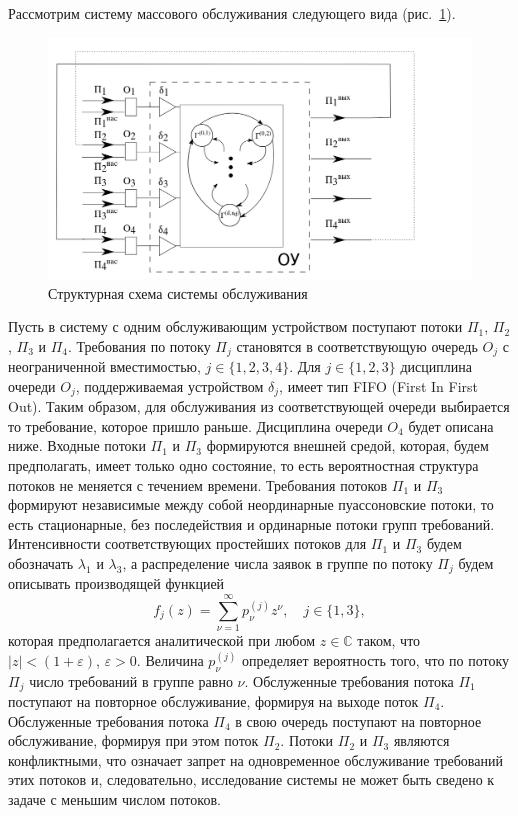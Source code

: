 \documentclass[12pt]{extarticle}
\theoremstyle{theorem}
\theoremstyle{remark}
\begin{document}
Рассмотрим систему массового обслуживания следующего вида (рис.~\ref{SystemScheme}).
\begin{figure}[h]
\includegraphics[scale=0.4]{SystemScheme.png} 
\caption{Структурная схема системы обслуживания}
\label{SystemScheme}
\end{figure}
Пусть в систему с одним обслуживающим устройством поступают потоки $\Pi_1$, $\Pi_2$, $\Pi_3$  и $\Pi_4$. Требования по потоку $\Pi_j$ становятся в соответствующую очередь $O_j$ с неограниченной вместимостью, $j\in \{1, 2, 3, 4\}$. Для $j \in \{1, 2, 3\}$ дисциплина очереди $O_j$, поддерживаемая устройством $\delta_j$, имеет тип FIFO (First In First Out). Таким образом, для обслуживания из соответствующей очереди выбирается то требование, которое пришло раньше. Дисциплина очереди $O_4$ будет описана ниже. Входные потоки $\Pi_1$ и $\Pi_3$ формируются внешней средой, которая, будем предполагать, имеет только одно состояние, то есть вероятностная структура потоков не меняется с течением времени. Требования потоков $\Pi_1$ и $\Pi_3$ формируют независимые между собой неординарные пуассоновские потоки, то есть  стационарные, без последействия и ординарные потоки групп требований. Интенсивности соответствующих простейших потоков для $\Pi_1$ и $\Pi_3$ будем обозначать $\lambda_1$ и $\lambda_3$, а распределение числа заявок в группе по потоку $\Pi_j$ будем описывать производящей функцией
\begin{equation}
f_j(z) = \sum_{\nu=1}^{\infty} p_{\nu}^{(j)} z ^{\nu}, \quad j\in \{1,3\},
\label{GeneratingFunc}
\end{equation}
которая предполагается аналитической при любом $z\in \mathbb{C}$ таком, что $|z|<(1+\varepsilon)$, $\varepsilon>0$. Величина $p_{\nu}^{(j)}$ определяет вероятность того, что по потоку $\Pi_j$ число требований в группе равно $\nu$. Обслуженные требования потока $\Pi_1$ поступают на повторное обслуживание, формируя на выходе поток $\Pi_4$. Обслуженные требования потока $\Pi_4$ в свою очередь поступают на повторное обслуживание, формируя при этом поток $\Pi_2$. Потоки $\Pi_2$ и $\Pi_3$ являются конфликтными, что означает запрет на одновременное обслуживание требований этих потоков и, следовательно, исследование системы не может быть сведено к задаче с меньшим числом потоков. 
\end{document}
